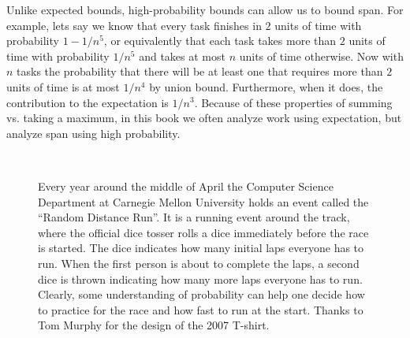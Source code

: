 {Unlike expected bounds, high-probability bounds can allow us to bound
span.
%
For example, lets say we know that every task finishes in $2$ units of
time with probability $1 - 1/n^5$, or equivalently that each task
takes more than $2$ units of time with probability $1/n^5$ and takes
at most $n$ units of time otherwise.
%
Now with $n$ tasks the probability that there will be at least one
that requires more than $2$ units of time is at most $1/n^4$ by union
bound.
%
Furthermore, when it does, the contribution to the expectation is
$1/n^3$.
%
Because of these properties of summing vs. taking a maximum, in this
book we often analyze work using expectation, but analyze span using
high probability.

\begin{figure}
\begin{center}
~~~~~
\begin{minipage}[b]{2.8in}
\caption{Every year around the middle of April the Computer Science
  Department at Carnegie Mellon University holds an event called the
  ``Random Distance Run''.  It is a running event around the track,
  where the official dice tosser rolls a dice immediately before the
  race is started.  The dice indicates how many initial laps everyone
  has to run.  When the first person is about to complete the laps, a
  second dice is thrown indicating how many more laps everyone has to
  run.  Clearly, some understanding of probability can help one decide
  how to practice for the race and how fast to run at the start.
  Thanks to Tom Murphy for the design of the 2007 T-shirt.}
\label{fig:rdr}
\end{minipage}
\end{center}
\end{figure}







}

